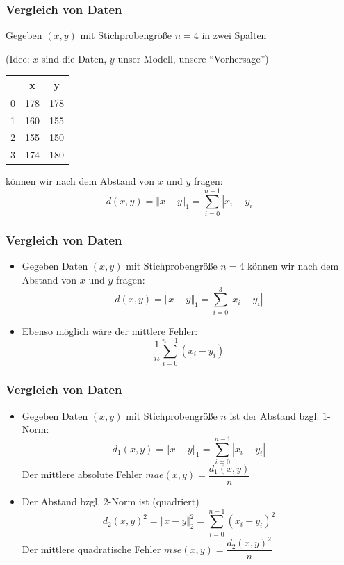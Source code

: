   \begin{frame}
    \frametitle{Vergleich von Daten}
    Gegeben $(x,y)$ mit Stichprobengröße $n=4$ in zwei Spalten
    
    (Idee: $x$ sind die Daten, $y$ unser Modell, unsere ``Vorhersage'')
    
    \begin{tabular}{|c|c|c|}
     \hline
       & x & y \\ \hline
     0 & 178 & 178 \\
     1 & 160 & 155 \\
     2 & 155 & 150 \\
     3 & 174 & 180 \\ \hline
    \end{tabular}
    
    können wir nach dem Abstand von $x$ und $y$ fragen:
    \[d(x,y) = \Vert x - y \Vert_1 = \sum_{i=0}^{n-1} |x_i-y_i| \]
  \end{frame}

    \begin{frame}
    \frametitle{Vergleich von Daten}
\begin{itemize}[<+->]
\item    Gegeben Daten $(x,y)$ mit Stichprobengröße $n=4$ können wir nach dem Abstand von $x$ und $y$ fragen:
  \[d(x,y) = \Vert x - y \Vert_1 = \sum_{i=0}^{3} |x_i-y_i| \]
\item    Ebenso möglich wäre der \alert{mittlere Fehler}:
  \[\dfrac{1}{n} \sum_{i=0}^{n-1} (x_i-y_i)\]
\end{itemize}
\end{frame}

    \begin{frame}
    \frametitle{Vergleich von Daten}
\begin{itemize}[<+->]
\item    Gegeben Daten $(x,y)$ mit Stichprobengröße $n$ ist der Abstand bzgl. $1$-Norm:
  \[d_1(x,y) = {\Vert x - y \Vert}_1 = \sum_{i=0}^{n-1} |x_i-y_i| \]
  Der \alert{mittlere absolute Fehler}
  $mae(x,y) = \dfrac{d_1(x,y)}{n} $
\item Der Abstand bzgl. $2$-Norm ist (quadriert)
  \[d_2(x,y)^2 = {\Vert x - y \Vert}_2^2 = \sum_{i=0}^{n-1} {\left(x_i-y_i\right)}^2 \]
  Der \alert{mittlere quadratische Fehler}
 $mse(x,y) = \dfrac{d_2(x,y)^2}{n} $
\end{itemize}
\end{frame}

